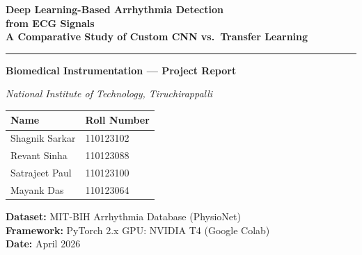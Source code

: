 \documentclass[12pt,a4paper]{article}
\begin{document}

\begin{titlepage}
    \centering
    \vspace*{2cm}
    {\LARGE\bfseries\color{myblue}
        Deep Learning-Based Arrhythmia Detection\\[0.4em]
        from ECG Signals\\[0.4em]
        \large A Comparative Study of Custom CNN vs.\ Transfer Learning
    \par}
    \vspace{1cm}
    \rule{\textwidth}{1.5pt}
    \vspace{0.5cm}

    {\large\bfseries Biomedical Instrumentation --- Project Report\par}
    \vspace{0.4cm}
    {\large\itshape National Institute of Technology, Tiruchirappalli\par}
    \vspace{1.2cm}

    {\normalsize
    \begin{tabular}{ll}
        \toprule
        \textbf{Name} & \textbf{Roll Number} \\
        \midrule
        Shagnik Sarkar  & 110123102 \\
        Revant Sinha    & 110123088 \\
        Satrajeet Paul  & 110123100 \\
        Mayank Das      & 110123064 \\
        \bottomrule
    \end{tabular}
    \par}
    \vspace{1cm}
    {\normalsize
        \textbf{Dataset:} MIT-BIH Arrhythmia Database (PhysioNet)\\[0.3em]
        \textbf{Framework:} PyTorch 2.x \quad GPU: NVIDIA T4 (Google Colab)\\[0.3em]
        \textbf{Date:} April 2026
    \par}
    \vspace{2cm}


\end{titlepage}
\end{document}
